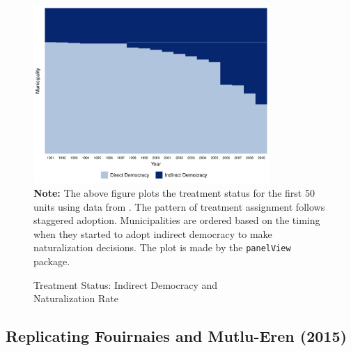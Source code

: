 \documentclass[12pt]{article}
\let\oldcenter\center
\let\oldendcenter\endcenter
\renewenvironment{center}{\setlength\topsep{0pt}\oldcenter}{\oldendcenter}
\begin{document}
\begin{figure}[!th]
\caption{Treatment Status: Indirect Democracy and\\Naturalization Rate}\label{fg:XY2015}
\centering
\begin{minipage}{0.85\linewidth}{
\begin{center}
\includegraphics[width = 0.8\textwidth]{ex_HH2015_treat.pdf}\\
\end{center}
}
\footnotesize\textbf{Note:} The above figure plots the treatment status for the first 50 units using data from \citet{hainmueller2015does}. The pattern of treatment assignment follows staggered adoption. Municipalities are ordered based on the timing when they started to adopt indirect democracy to make naturalization decisions. The plot is made by the \texttt{panelView} package.
\end{minipage}
\end{figure}

\clearpage

\subsection{Replicating Fouirnaies and Mutlu-Eren (2015)}
\end{document}
